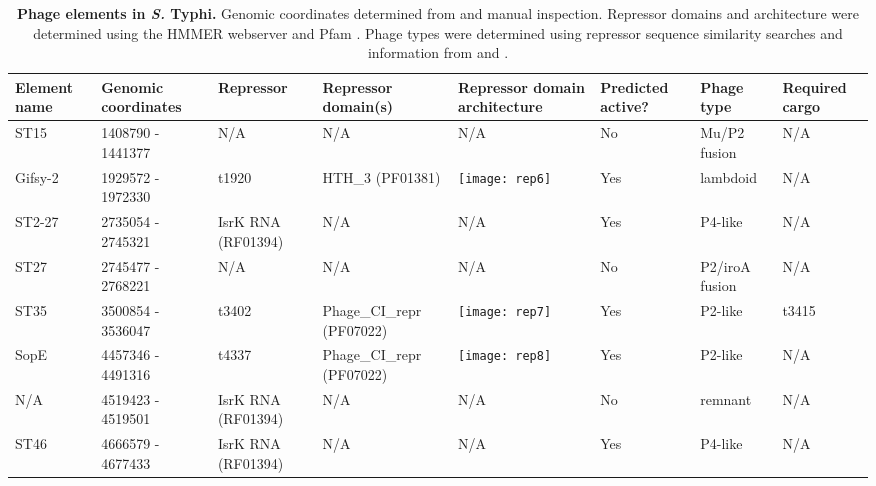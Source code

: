 %
\begin{table}
   \tiny
   \centering
   \noindent
    \caption[Phage elements in {\it S.} Typhi]{\textbf{Phage elements in {\it S.} Typhi.} Genomic coordinates determined from \textcite{Thomson2004} and manual inspection. Repressor domains and architecture were determined using the HMMER webserver \parencite{Finn2011} and Pfam \parencite{Punta2012}. Phage types were determined using repressor sequence similarity searches and information from \textcite{Thomson2004} and \textcite{Kropinski2007}. }
    \begin{tabular}{     m{0.5in}
    				m{0.4in}
				m{0.4in}
				m{0.6in}
				m{1.6in}
				m{0.4in}
				m{0.5in}
				m{0.5in}
				}
   
    \\
     \toprule
    \textbf{Element name} & \textbf{Genomic coordinates} & \textbf{Repressor} & \textbf{Repressor domain(s)} & \textbf{Repressor domain architecture} & \textbf{Predicted active?} & \textbf{Phage type} & \textbf{Required cargo} \\
    \midrule
    ST15  & 1408790 - 1441377 & N/A   & N/A   & N/A   & No    & Mu/P2 fusion & N/A \\
    Gifsy-2 & 1929572 - 1972330 & t1920 & HTH\_3 (PF01381) &    \texttt{[image: rep6]}   & Yes   & lambdoid & N/A \\
    ST2-27 & 2735054 - 2745321 & IsrK RNA (RF01394) & N/A   & N/A   & Yes   & P4-like & N/A \\
    ST27  & 2745477 - 2768221 & N/A   & N/A   & N/A   & No    & P2/iroA fusion & N/A \\
    ST35  & 3500854 - 3536047 & t3402 & Phage\_CI\_repr (PF07022) &   \texttt{[image: rep7]}    & Yes   & P2-like & t3415 \\
    SopE  & 4457346 - 4491316 & t4337 & Phage\_CI\_repr (PF07022) &   \texttt{[image: rep8]}    & Yes   & P2-like & N/A \\
    N/A   & 4519423 - 4519501 & IsrK RNA (RF01394) & N/A   & N/A   & No    & remnant & N/A \\
    ST46  & 4666579 - 4677433 & IsrK RNA (RF01394) & N/A   & N/A   & Yes   & P4-like & N/A \\
    \bottomrule
    \end{tabular}%
    \label{tab:ty_phage}%
\end{table}

